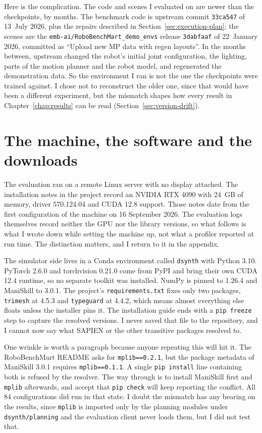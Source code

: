 Here is the complication. The code and scenes I evaluated on are newer than the checkpoints, by months. The benchmark code is upstream commit \texttt{33ca547} of 13~July 2026, plus the repairs described in Section~\ref{sec:execution-plan}; the scenes are the \texttt{emb-ai/RoboBenchMart\_demo\_envs} release \texttt{3dabfaaf} of 22~January 2026, committed as ``Upload new MP data with regen layouts''. In the months between, upstream changed the robot's initial joint configuration, the lighting, parts of the motion planner and the robot model, and regenerated the demonstration data. So the environment I ran is not the one the checkpoints were trained against. I chose not to reconstruct the older one, since that would have been a different experiment, but the mismatch shapes how every result in Chapter~\ref{chap:results} can be read (Section~\ref{sec:version-drift}).

\section{The machine, the software and the downloads}
\label{sec:setup}

The evaluation ran on a remote Linux server with no display attached. The installation notes in the project record an NVIDIA RTX 4090 with 24~GB of memory, driver 570.124.04 and CUDA 12.8 support. Those notes date from the first configuration of the machine on 16 September 2026. The evaluation logs themselves record neither the GPU nor the library versions, so what follows is what I wrote down while setting the machine up, not what a profiler reported at run time. The distinction matters, and I return to it in the appendix.

The simulator side lives in a Conda environment called \texttt{dsynth} with Python 3.10. PyTorch 2.6.0 and torchvision 0.21.0 come from PyPI and bring their own CUDA 12.4 runtime, so no separate toolkit was installed. NumPy is pinned to 1.26.4 and ManiSkill to 3.0.1. The project's \texttt{requirements.txt} fixes only two packages, \texttt{trimesh} at 4.5.3 and \texttt{typeguard} at 4.4.2, which means almost everything else floats unless the installer pins it. The installation guide ends with a \texttt{pip freeze} step to capture the resolved versions. I never saved that file to the repository, and I cannot now say what SAPIEN or the other transitive packages resolved to.

One wrinkle is worth a paragraph because anyone repeating this will hit it. The RoboBenchMart README asks for \texttt{mplib==0.2.1}, but the package metadata of ManiSkill 3.0.1 requires \texttt{mplib==0.1.1}. A single \texttt{pip install} line containing both is refused by the resolver. The way through is to install ManiSkill first and \texttt{mplib} afterwards, and accept that \texttt{pip check} will keep reporting the conflict. All 84 configurations did run in that state. I doubt the mismatch has any bearing on the results, since \texttt{mplib} is imported only by the planning modules under \texttt{dsynth/planning} and the evaluation client never loads them, but I did not test that.

